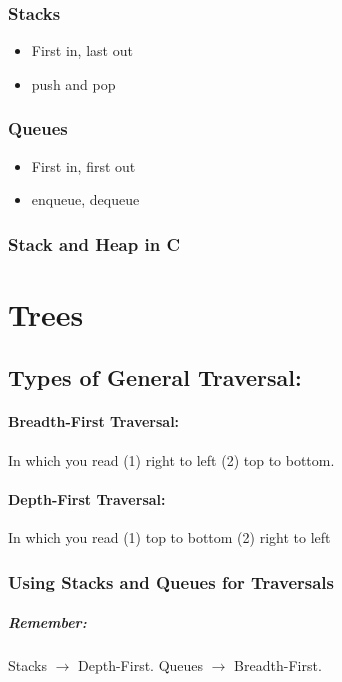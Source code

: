 \documentclass[a4paper,12pt]{report}
\begin{document}
\subsection{Stacks}
\begin{itemize}
\item First in, last out
\item push and pop
\end{itemize}
\subsection{Queues}
\begin{itemize}
\item First in, first out
\item enqueue, dequeue
\end{itemize}

\subsection{Stack and Heap in C}


\chapter{Trees}
\section{Types of General Traversal:}
\subsubsection{Breadth-First Traversal: }
In which you read (1) right to left (2) top to bottom.
\subsubsection{Depth-First Traversal: }
In which you read (1) top to bottom (2) right to left

\subsection{Using Stacks and Queues for Traversals}
\paragraph{Remember: } Stacks $\to$ Depth-First. Queues $\to$ Breadth-First. 
\end{document}
